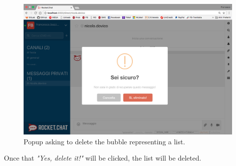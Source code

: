 \begin{figure}[H]
  \centering 
  \includegraphics[width=\textwidth]{Sections/3-HowToUse/Images/popup_delete_message.png}
  \caption{Popup asking to delete the bubble representing a list.}
\end{figure}

Once that \textit{"Yes, delete it!"} will be clicked, the list will be deleted.